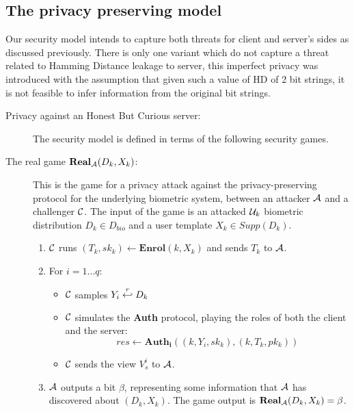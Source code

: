 \subsection{The privacy preserving model}
  Our security model intends to capture both threats for client and server's
  sides as discussed previously. There is only one variant which do not capture a
  threat related to Hamming Distance leakage to server, this imperfect privacy
  was introduced with the assumption that given such a value of HD of 2 bit
  strings, it is not feasible to infer information from the original bit
  strings.
\begin{description}
\item[Privacy against an Honest But Curious server:] The security model is defined in terms of the following security games.

\item[The real game $\mathbf{Real}_{\mathcal{A}}(D_k,X_k)$:] This is the game for a privacy attack against the
  privacy-preserving protocol for the underlying biometric system, between an attacker $\mathcal{A}$ and a challenger
  $\mathcal{C}$. The input of the game is an attacked $\mathcal{U}_k$ biometric distribution $D_k \in D_{bio}$ and a user
  template $X_k \in Supp(D_k)$.
  \begin{enumerate} %
  \item $\mathcal{C}$ runs $(T_k, sk_k) \gets \mathbf{Enrol}(k,X_k)$ and sends $T_k$ to $\mathcal{A}$.
  \item For $i = 1 \dots q$:
    \begin{itemize}
    \item $\mathcal{C}$ samples \(Y_{i} \stackrel{r}{\hookleftarrow} D_{k}\)
    \item $\mathcal{C}$ simulates the \textbf{Auth} protocol, playing the roles of both the client and the server:
      \[
        res \gets \mathbf{Auth_i}((k, Y_i, sk_k), (k, T_k, pk_k))
      \]
    \item $\mathcal{C}$ sends the view $V_s^{i}$ to $\mathcal{A}$.
    \end{itemize}
  \item $\mathcal{A}$ outputs a bit $\beta$, representing some information that $\mathcal{A}$ has discovered about
    $(D_k,X_k)$. The game output is $\mathbf{Real}_{\mathcal{A}}(D_k,X_k) = \beta$.
  \end{enumerate}


\end{description}
